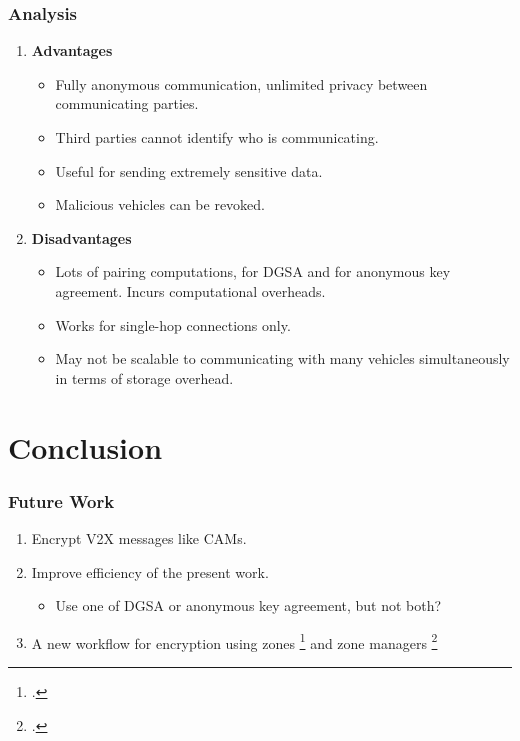 \documentclass{beamer}
\begin{document}
    \begin{frame}
        \frametitle{Analysis}
        \begin{enumerate}
            \item<1-> \textbf{Advantages}
            \begin{itemize}
                \item Fully anonymous communication, unlimited privacy between
                communicating parties.
                \item Third parties cannot identify who is communicating.
                \item Useful for sending extremely sensitive data.
                \item Malicious vehicles can be revoked.
            \end{itemize}
            \item<2-> \textbf{Disadvantages}
            \begin{itemize}
                \item Lots of pairing computations, for DGSA and for anonymous
                key agreement. Incurs computational overheads.
                \item Works for single-hop connections only.
                \item May not be scalable to communicating with many vehicles
                simultaneously in terms of storage overhead.
            \end{itemize}
        \end{enumerate}
    \end{frame}

    \section{Conclusion}
    \begin{frame}
        \frametitle{Future Work}
        \begin{enumerate}
            \item<1-> Encrypt V2X messages like CAMs.
            \item<2-> Improve efficiency of the present work.
            \begin{itemize}
                \item Use one of DGSA or anonymous key agreement, but not both?
            \end{itemize}
            \item<3-> A new workflow for encryption using zones
            \footcite{camenischZoneEncryptionAnonymous2020} and zone managers
            \footcite{yuePracticalPrivacypreservingCommunication2022b}
        \end{enumerate}
    \end{frame}
\end{document}
